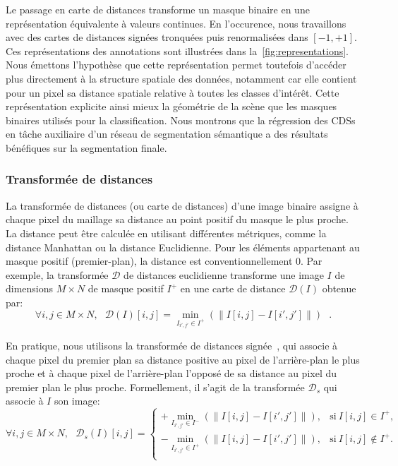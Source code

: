 Le passage en carte de distances transforme un masque binaire en une représentation équivalente à valeurs continues. En l'occurence, nous travaillons avec des cartes de distances signées tronquées puis renormalisées dans $[-1,+1]$. Ces représentations des annotations sont illustrées dans la~\cref{fig:representations}. Nous émettons l'hypothèse que cette représentation permet toutefois d'accéder plus directement à la structure spatiale des données, notamment car elle contient pour un pixel sa distance spatiale relative à toutes les classes d'intérêt. Cette représentation explicite ainsi mieux la géométrie de la scène que les masques binaires utilisés pour la classification. Nous montrons que la régression des \glspl{CDS} en tâche auxiliaire d'un réseau de segmentation sémantique a des résultats bénéfiques sur la segmentation finale.

\subsubsection{Transformée de distances}

La transformée de distances (ou carte de distances) d'une image binaire assigne à chaque pixel du maillage sa distance au point positif du masque le plus proche. La distance peut être calculée en utilisant différentes métriques, comme la distance Manhattan ou la distance Euclidienne. Pour les éléments appartenant au masque positif (premier-plan), la distance est conventionnellement 0. Par exemple, la transformée $\mathcal{D}$ de distances euclidienne transforme une image $I$ de dimensions $M\times N$ de masque positif $I^+$ en une carte de distance $\mathcal{D}(I)$ obtenue par:
\begin{equation}
  \forall i,j \in M\times N, ~~~\mathcal{D}(I)[i,j] = \min_{I_{i',j'} \in I^+} (\parallel I[i,j] - I[i',j'] \parallel)~~~.
\end{equation}

En pratique, nous utilisons la transformée de distances signée~\cite{q._z._ye_signed_1988}, qui associe à chaque pixel du premier plan sa distance positive au pixel de l'arrière-plan le plus proche et à chaque pixel de l'arrière-plan l'opposé de sa distance au pixel du premier plan le plus proche. Formellement, il s'agit de la transformée $\mathcal{D}_s$ qui associe à $I$ son image:
\begin{equation}
\forall i,j \in M\times N,~~~\mathcal{D}_s(I)[i,j] =
\begin{cases}
+ \min_{I_{i',j'} \in I^-} (\parallel I[i,j] - I[i',j'] \parallel), & \text{si}~I[i,j] \in I^+,\\
- \min_{I_{i',j'} \in I^+} (\parallel I[i,j] - I[i',j'] \parallel), & \text{si}~I[i,j] \notin I^+.\\
\end{cases}
\end{equation}


